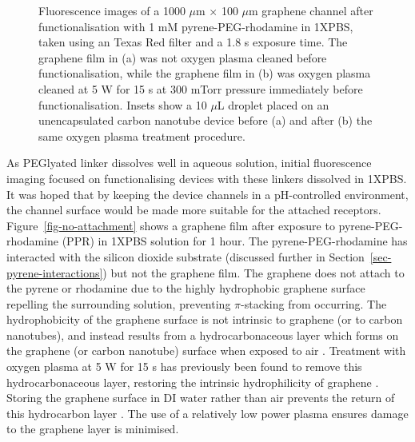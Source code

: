 \documentclass[
  a4paper,
]{scrbook}
\begin{document}
\begin{figure}
\begin{minipage}[t]{0.47\linewidth}
{{}

}

\subcaption{\label{fig-attachment-post-plasma}}
\end{minipage}%

\caption{\label{fig-hydrophobicity}Fluorescence images of a 1000
\(\mu\)m \(\times\) 100 \(\mu\)m graphene channel after
functionalisation with 1 mM pyrene-PEG-rhodamine in 1XPBS, taken using
an Texas Red filter and a 1.8 s exposure time. The graphene film in (a)
was not oxygen plasma cleaned before functionalisation, while the
graphene film in (b) was oxygen plasma cleaned at 5 W for 15 s at 300
mTorr pressure immediately before functionalisation. Insets show a 10
\(\mu\)L droplet placed on an unencapsulated carbon nanotube device
before (a) and after (b) the same oxygen plasma treatment procedure.}

\end{figure}

As PEGlyated linker dissolves well in aqueous solution, initial
fluorescence imaging focused on functionalising devices with these
linkers dissolved in 1XPBS. It was hoped that by keeping the device
channels in a pH-controlled environment, the channel surface would be
made more suitable for the attached receptors.
Figure~\ref{fig-no-attachment} shows a graphene film after exposure to
pyrene-PEG-rhodamine (PPR) in 1XPBS solution for 1 hour. The
pyrene-PEG-rhodamine has interacted with the silicon dioxide substrate
(discussed further in Section~\ref{sec-pyrene-interactions}) but not the
graphene film. The graphene does not attach to the pyrene or rhodamine
due to the highly hydrophobic graphene surface repelling the surrounding
solution, preventing \(\pi\)-stacking from occurring. The hydrophobicity
of the graphene surface is not intrinsic to graphene (or to carbon
nanotubes), and instead results from a hydrocarbonaceous layer which
forms on the graphene (or carbon nanotube) surface when exposed to air
\autocite{Ashraf2014,Stando2019,Park2022}. Treatment with oxygen plasma
at 5 W for 15 s has previously been found to remove this
hydrocarbonaceous layer, restoring the intrinsic hydrophilicity of
graphene \autocite{Shin2010}. Storing the graphene surface in DI water
rather than air prevents the return of this hydrocarbon layer
\autocite{Ashraf2014}. The use of a relatively low power plasma ensures
damage to the graphene layer is minimised.
\end{document}
